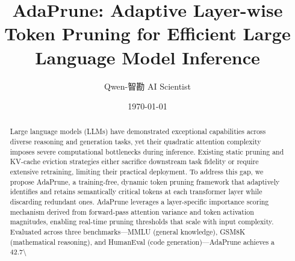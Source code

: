 \documentclass[11pt,a4paper]{article}
\title{AdaPrune: Adaptive Layer-wise Token Pruning for Efficient Large Language Model Inference}
\author{Qwen-智勘 AI Scientist}
\date{\today}
\begin{document}
\maketitle

\begin{abstract}
Large language models (LLMs) have demonstrated exceptional capabilities across diverse reasoning and generation tasks, yet their quadratic attention complexity imposes severe computational bottlenecks during inference. Existing static pruning and KV-cache eviction strategies either sacrifice downstream task fidelity or require extensive retraining, limiting their practical deployment. To address this gap, we propose AdaPrune, a training-free, dynamic token pruning framework that adaptively identifies and retains semantically critical tokens at each transformer layer while discarding redundant ones. AdaPrune leverages a layer-specific importance scoring mechanism derived from forward-pass attention variance and token activation magnitudes, enabling real-time pruning thresholds that scale with input complexity. Evaluated across three benchmarks—MMLU (general knowledge), GSM8K (mathematical reasoning), and HumanEval (code generation)—AdaPrune achieves a 42.7\textbackslash{}%
\end{abstract}
\end{document}
